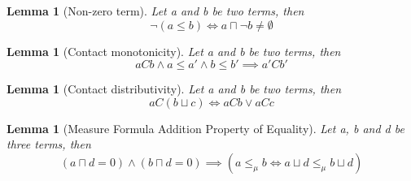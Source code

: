 \documentclass{article}
\newtheorem{lemma}[theorem]{Lemma}
\begin{document}
\begin{lemma}[Non-zero term]
	Let a and b be two terms, then
	\begin{equation*}
		\neg(a \le b) \iff a \sqcap \neg b \neq \emptyset
	\end{equation*}
\end{lemma}

\begin{lemma}[Contact monotonicity]
	Let a and b be two terms, then
	\begin{equation*}
		aCb \land a \leq a' \land b \le b' \implies a'Cb'
	\end{equation*}
\end{lemma}

\begin{lemma}[Contact distributivity]
	Let a and b be two terms, then
	\begin{equation*}
		aC(b \sqcup c) \iff aCb \lor aCc
	\end{equation*}
\end{lemma}

\begin{lemma}[Measure Formula Addition Property of Equality]
	Let a, b and d be three terms, then
	\begin{equation*}
		(a \sqcap d = 0) \land (b \sqcap d = 0) \implies (a \le_\mu b \iff a \sqcup d \le_\mu b \sqcup d)
	\end{equation*}
\end{lemma}
\end{document}
